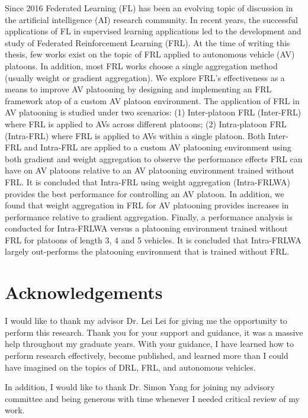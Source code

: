 \documentclass[oneside, 12pt]{book}
\begin{document}
Since 2016 Federated Learning (FL) has been an evolving topic of discussion in the artificial
intelligence (AI) research community.  In recent years, the successful applications of FL
in supervised learning applications led to the development and study of
Federated Reinforcement Learning (FRL).  At the time of writing this thesis,
few works exist on the topic of FRL applied to
autonomous vehicle (AV) platoons. In addition, most FRL works choose a single aggregation
method (usually weight or gradient aggregation). We explore FRL's effectiveness as a means
to improve AV platooning by designing and implementing an FRL framework atop of a custom
AV platoon environment.  The application of FRL in AV platooning is studied under two
scenarios: (1)  Inter-platoon FRL (Inter-FRL) where FRL is applied to AVs across different
platoons; (2) Intra-platoon FRL (Intra-FRL) where FRL is applied to AVs within a single
platoon. Both Inter-FRL and Intra-FRL are applied to a custom AV platooning environment using
both gradient and weight aggregation to observe the performance effects FRL can have on AV
platoons relative to an AV platooning environment trained without FRL.  It is concluded that
Intra-FRL using weight aggregation (Intra-FRLWA) provides the best performance for
controlling an AV platoon. In addition, we found that weight aggregation in FRL for
AV platooning provides increases in performance relative to gradient aggregation.
Finally, a performance analysis is conducted for Intra-FRLWA versus a platooning
environment trained without FRL for platoons of length 3, 4 and 5 vehicles. It is concluded
that Intra-FRLWA largely out-performs the platooning environment that is trained without FRL.

\chapter*{Acknowledgements}
I would like to thank my advisor Dr. Lei Lei for giving me the opportunity to perform this research.
Thank you for your support and guidance, it was a massive help throughout my graduate years.  With your guidance,
I have learned how to perform research effectively, become published, and learned more than I could have imagined on
the topics of DRL, FRL, and autonomous vehicles.

In addition, I would like to thank Dr. Simon Yang for joining my advisory committee and being
generous with time whenever I needed critical review of my work.

\tableofcontents
\listoftables
\listoffigures
\newpage
\end{document}

